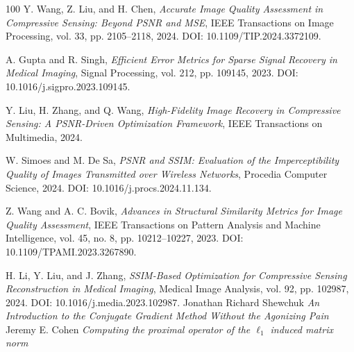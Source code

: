 \documentclass[10pt,aspectration=169]{beamer}
\begin{document}
\begin{thebibliography}{100}
         Y. Wang, Z. Liu, and H. Chen, \emph{Accurate Image Quality Assessment in Compressive Sensing: Beyond PSNR and MSE}, IEEE Transactions on Image Processing, vol. 33, pp. 2105--2118, 2024. DOI: 10.1109/TIP.2024.3372109.

       A. Gupta and R. Singh, \emph{Efficient Error Metrics for Sparse Signal Recovery in Medical Imaging}, Signal Processing, vol. 212, pp. 109145, 2023. DOI: 10.1016/j.sigpro.2023.109145.

       Y. Liu, H. Zhang, and Q. Wang, \emph{High-Fidelity Image Recovery in Compressive Sensing: A PSNR-Driven Optimization Framework}, IEEE Transactions on Multimedia, 2024.

       W. Simoes and M. De Sa, \emph{PSNR and SSIM: Evaluation of the Imperceptibility Quality of Images Transmitted over Wireless Networks}, Procedia Computer Science, 2024. DOI: 10.1016/j.procs.2024.11.134.


       Z. Wang and A. C. Bovik, \emph{Advances in Structural Similarity Metrics for Image Quality Assessment}, IEEE Transactions on Pattern Analysis and Machine Intelligence, vol. 45, no. 8, pp. 10212--10227, 2023. DOI: 10.1109/TPAMI.2023.3267890.

       H. Li, Y. Liu, and J. Zhang, \emph{SSIM-Based Optimization for Compressive Sensing Reconstruction in Medical Imaging}, Medical Image Analysis, vol. 92, pp. 102987, 2024. DOI: 10.1016/j.media.2023.102987.
       Jonathan Richard Shewchuk \emph{An Introduction to the Conjugate Gradient Method Without the Agonizing Pain}
       Jeremy E. Cohen \emph{Computing the proximal operator of the $\ell_1$ induced matrix norm}
    \end{thebibliography}
\end{document}
